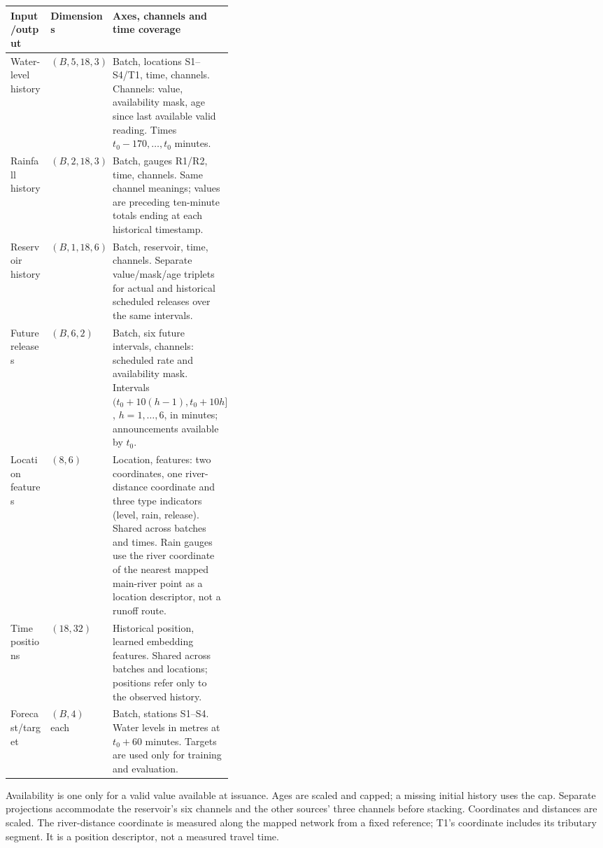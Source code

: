 \clearpage
{\small
\begin{tabularx}{\textwidth}{@{}p{0.18\linewidth}p{0.19\linewidth}X@{}}
\toprule
\textbf{Input/output} & \textbf{Dimensions} & \textbf{Axes, channels and time coverage}\\
\midrule
Water-level history & $(B,5,18,3)$ & Batch, locations S1--S4/T1, time, channels. Channels: value, availability mask, age since last available valid reading. Times $t_0-170,\ldots,t_0$ minutes.\\
Rainfall history & $(B,2,18,3)$ & Batch, gauges R1/R2, time, channels. Same channel meanings; values are preceding ten-minute totals ending at each historical timestamp.\\
Reservoir history & $(B,1,18,6)$ & Batch, reservoir, time, channels. Separate value/mask/age triplets for actual and historical scheduled releases over the same intervals.\\
Future releases & $(B,6,2)$ & Batch, six future intervals, channels: scheduled rate and availability mask. Intervals $(t_0+10(h-1),t_0+10h]$, $h=1,\ldots,6$, in minutes; announcements available by $t_0$.\\
Location features & $(8,6)$ & Location, features: two coordinates, one river-distance coordinate and three type indicators (level, rain, release). Shared across batches and times. Rain gauges use the river coordinate of the nearest mapped main-river point as a location descriptor, not a runoff route.\\
Time positions & $(18,32)$ & Historical position, learned embedding features. Shared across batches and locations; positions refer only to the observed history.\\
Forecast/target & $(B,4)$ each & Batch, stations S1--S4. Water levels in metres at $t_0+60$ minutes. Targets are used only for training and evaluation.\\
\bottomrule
\end{tabularx}}

Availability is one only for a valid value available at issuance. Ages are scaled and capped; a missing initial history uses the cap. Separate projections accommodate the reservoir's six channels and the other sources' three channels before stacking. Coordinates and distances are scaled. The river-distance coordinate is measured along the mapped network from a fixed reference; T1's coordinate includes its tributary segment. It is a position descriptor, not a measured travel time.

